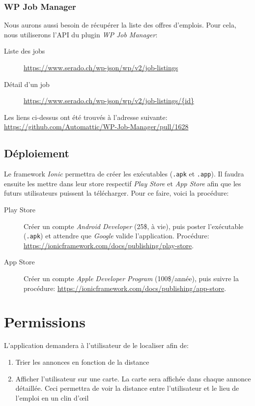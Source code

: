\documentclass[french]{report}
\begin{document}
\subsubsection{WP Job Manager}

Nous aurons aussi besoin de récupérer la liste des offres d'emplois. Pour cela, nous
utiliserons l'API du plugin \textit{WP Job Manager}:
\begin{description}
    \item[Liste des jobs] \url{https://www.serado.ch/wp-json/wp/v2/job-listings}
    \item[Détail d'un job] \url{https://www.serado.ch/wp-json/wp/v2/job-listings/{id}} 
\end{description}
\vspace{1em}

Les liens ci-dessus ont été trouvés à l'adresse suivante: \url{https://github.com/Automattic/WP-Job-Manager/pull/1628}

\subsection{Déploiement}

Le framework \textit{Ionic} permettra de créer les exécutables (\verb|.apk| et
\verb|.app|). Il faudra ensuite les mettre dans leur store respectif 
\textit{Play Store} et \textit{App Store} afin que les futurs utilisateurs puissent
la télécharger. Pour ce faire, voici la procédure:
\begin{description}
    \item[Play Store] Créer un compte \textit{Android Developer} (25\$, à vie), puis poster
    l'exécutable (\verb|.apk|) et attendre que \textit{Google} valide l'application.
    Procédure: \url{https://ionicframework.com/docs/publishing/play-store}.
    \item[App Store] Créer un compte \textit{Apple Developer Program} (100\$/année),
    puis suivre la procédure: \url{https://ionicframework.com/docs/publishing/app-store}.
\end{description}


\section{Permissions}
L'application demandera à l'utilisateur de le localiser afin de:
\begin{enumerate}
    \item Trier les annonces en fonction de la distance
    \item Afficher l'utilisateur sur une carte. La carte sera affichée dans chaque
    annonce détaillée. Ceci permettra de voir la distance entre l'utilisateur et le
    lieu de l'emploi en un clin d'\oe il
\end{enumerate}
\end{document}
